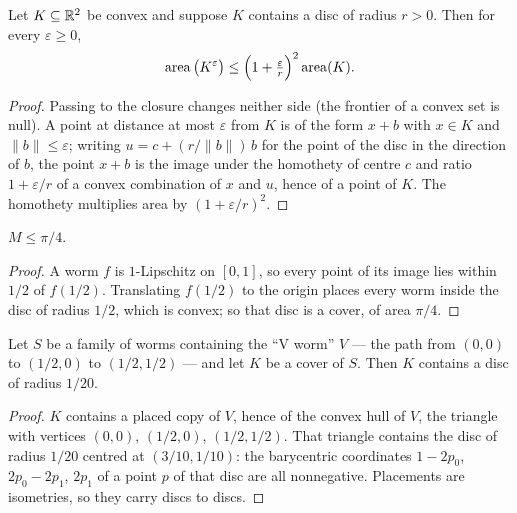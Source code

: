 \begin{theorem}
    \label{thm:dilationBound}
    \leanok
    Let $K \subseteq \mathbb{R}^2$ be convex and suppose $K$ contains a disc of radius
    $r > 0$. Then for every $\varepsilon \ge 0$,
    \[
        \operatorname{area}\big(K^{\varepsilon}\big)
            \le \Big(1 + \tfrac{\varepsilon}{r}\Big)^{2} \operatorname{area}(K).
    \]
\end{theorem}
\begin{proof}
    \leanok
    Passing to the closure changes neither side (the frontier of a convex set is
    null). A point at distance at most $\varepsilon$ from $K$ is of the form
    $x + b$ with $x \in K$ and $\lVert b\rVert \le \varepsilon$; writing
    $u = c + (r/\lVert b\rVert)\, b$ for the point of the disc in the direction
    of $b$, the point $x + b$ is the image under the homothety of centre $c$ and
    ratio $1 + \varepsilon/r$ of a convex combination of $x$ and $u$, hence of a
    point of $K$. The homothety multiplies area by $(1 + \varepsilon/r)^2$.
\end{proof}

\begin{theorem}
    \label{thm:apriori}
    \leanok
    $M \le \pi/4$.
\end{theorem}
\begin{proof}
    \leanok
    A worm $f$ is $1$-Lipschitz on $[0,1]$, so every point of its image lies
    within $1/2$ of $f(1/2)$. Translating $f(1/2)$ to the origin places every
    worm inside the disc of radius $1/2$, which is convex; so that disc is a
    cover, of area $\pi/4$.
\end{proof}

\begin{theorem}
    \label{thm:coverDisc}
    \leanok
    Let $S$ be a family of worms containing the ``V worm'' $V$ --- the path from
    $(0,0)$ to $(1/2,0)$ to $(1/2,1/2)$ --- and let $K$ be a cover of $S$. Then
    $K$ contains a disc of radius $1/20$.
\end{theorem}
\begin{proof}
    \leanok
    $K$ contains a placed copy of $V$, hence of the convex hull of $V$, the
    triangle with vertices $(0,0)$, $(1/2,0)$, $(1/2,1/2)$. That triangle
    contains the disc of radius $1/20$ centred at $(3/10, 1/10)$: the
    barycentric coordinates $1 - 2p_0$, $2p_0 - 2p_1$, $2p_1$ of a point $p$ of
    that disc are all nonnegative. Placements are isometries, so they carry
    discs to discs.
\end{proof}

